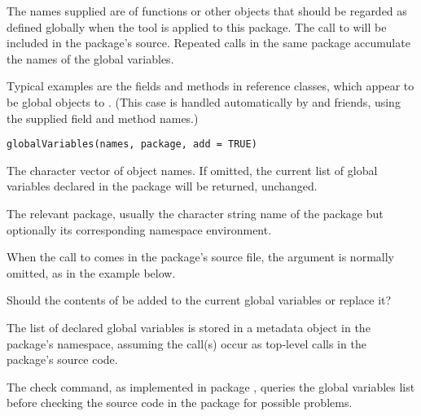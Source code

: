 %
\begin{Description}\relax
The names supplied are of functions or other objects that should be
regarded as defined globally when the  tool is applied to
this package.  The call to  will be included in
the package's source.  Repeated calls in the same package accumulate
the names of the global variables.

Typical examples are the fields and methods in reference classes,
which appear to be global objects to .
(This case is handled automatically by  and
friends, using the supplied field and method names.)
\end{Description}
%
\begin{Usage}
\begin{verbatim}
globalVariables(names, package, add = TRUE)
\end{verbatim}
\end{Usage}
%
\begin{Arguments}
\begin{ldescription}
\item[\code{names}] 
The character vector of object names.  If omitted, the current list of
global variables declared in the package will be returned, unchanged.

\item[\code{package}] 
The relevant package, usually the character string name of the package
but optionally its corresponding namespace environment.

When the call to  comes in the package's source
file, the argument is normally omitted, as in the example below.

\item[\code{add}] 
Should the contents of  be added to the current global
variables or replace it?

\end{ldescription}
\end{Arguments}
%
\begin{Details}\relax
The list of declared global variables is stored in a metadata object
in the package's namespace, assuming the  call(s)
occur as top-level calls in the package's source code.

The check command, as implemented in package , queries the
global variables list before checking the \R{} source code in the
package for possible problems.
\end{Details}
